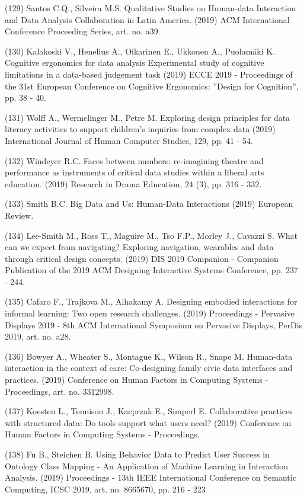 \documentclass[
	12pt,				%
	oneside,			%
	a4paper,			%
	english,			%
	brazil				%
	]{abntex2ppgsi}
\begin{document}
\begin{apendicesenv}
(129) Santos C.Q., Silveira M.S. Qualitative Studies on Human-data Interaction and Data Analysis Collaboration in Latin America. (2019) ACM International Conference Proceeding Series, art. no. a39.

(130) Kalakoski V., Henelius A., Oikarinen E., Ukkonen A., Puolamäki K. Cognitive ergonomics for data analysis Experimental study of cognitive limitations in a data-based judgement task (2019) ECCE 2019 - Proceedings of the 31st European Conference on Cognitive Ergonomics: ''Design for Cognition'', pp. 38 - 40.

(131) Wolff A., Wermelinger M., Petre M. Exploring design principles for data literacy activities to support children's inquiries from complex data
(2019) International Journal of Human Computer Studies, 129, pp. 41 - 54.


(132) Windeyer R.C. Faces between numbers: re-imagining theatre and performance as instruments of critical data studies within a liberal arts education. (2019) Research in Drama Education, 24 (3), pp. 316 - 332.


(133) Smith B.C. Big Data and Us: Human-Data Interactions (2019) European Review.

(134) Lee-Smith M., Ross T., Maguire M., Tso F.P., Morley J., Cavazzi S. What can we expect from navigating? Exploring navigation, wearables and data through critical design concepts. (2019) DIS 2019 Companion - Companion Publication of the 2019 ACM Designing Interactive Systems Conference, pp. 237 - 244.

(135) Cafaro F., Trajkova M., Alhakamy A. Designing embodied interactions for informal learning: Two open research challenges. (2019) Proceedings - Pervasive Displays 2019 - 8th ACM International Symposium on Pervasive Displays, PerDis 2019, art. no. a28.

(136) Bowyer A., Wheater S., Montague K., Wilson R., Snape M. Human-data interaction in the context of care: Co-designing family civic data interfaces and practices. (2019) Conference on Human Factors in Computing Systems - Proceedings, art. no. 3312998.

(137) Koesten L., Tennison J., Kacprzak E., Simperl E. Collaborative practices with structured data: Do tools support what users need? (2019) Conference on Human Factors in Computing Systems - Proceedings.

(138) Fu B., Steichen B. Using Behavior Data to Predict User Success in Ontology Class Mapping - An Application of Machine Learning in Interaction Analysis. (2019) Proceedings - 13th IEEE International Conference on Semantic Computing, ICSC 2019, art. no. 8665670, pp. 216 - 223


\end{apendicesenv}
\end{document}
